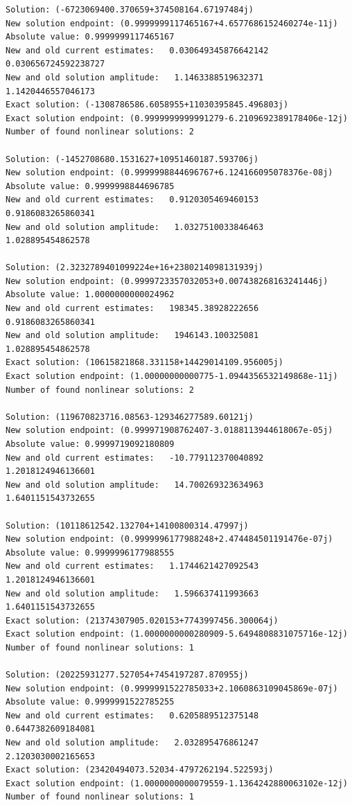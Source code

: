 \documentclass{article}
\begin{document}
\begin{verbatim}
Solution: (-6723069400.370659+374508164.67197484j)
New solution endpoint: (0.9999999117465167+4.6577686152460274e-11j) Absolute value: 0.9999999117465167
New and old current estimates:   0.030649345876642142    0.030656724592238727
New and old solution amplitude:   1.1463388519632371    1.1420446557046173
Exact solution: (-1308786586.6058955+11030395845.496803j)
Exact solution endpoint: (0.9999999999991279-6.2109692389178406e-12j)
Number of found nonlinear solutions: 2

Solution: (-1452708680.1531627+10951460187.593706j)
New solution endpoint: (0.9999998844696767+6.124166095078376e-08j) Absolute value: 0.9999998844696785
New and old current estimates:   0.9120305469460153    0.9186083265860341
New and old solution amplitude:   1.0327510033846463    1.028895454862578

Solution: (2.3232789401099224e+16+2380214098131939j)
New solution endpoint: (0.9999723357032053+0.007438268163241446j) Absolute value: 1.0000000000024962
New and old current estimates:   198345.38928222656    0.9186083265860341
New and old solution amplitude:   1946143.100325081    1.028895454862578
Exact solution: (10615821868.331158+14429014109.956005j)
Exact solution endpoint: (1.00000000000775-1.0944356532149868e-11j)
Number of found nonlinear solutions: 2

Solution: (119670823716.08563-129346277589.60121j)
New solution endpoint: (0.999971908762407-3.0188113944618067e-05j) Absolute value: 0.9999719092180809
New and old current estimates:   -10.779112370040892    1.2018124946136601
New and old solution amplitude:   14.700269323634963    1.6401151543732655

Solution: (10118612542.132704+14100800314.47997j)
New solution endpoint: (0.9999996177988248+2.474484501191476e-07j) Absolute value: 0.9999996177988555
New and old current estimates:   1.1744621427092543    1.2018124946136601
New and old solution amplitude:   1.596637411993663    1.6401151543732655
Exact solution: (21374307905.020153+7743997456.300064j)
Exact solution endpoint: (1.0000000000280909-5.6494808831075716e-12j)
Number of found nonlinear solutions: 1

Solution: (20225931277.527054+7454197287.870955j)
New solution endpoint: (0.9999991522785033+2.1060863109045869e-07j) Absolute value: 0.9999991522785255
New and old current estimates:   0.6205889512375148    0.6447382609184081
New and old solution amplitude:   2.032895476861247    2.1203030002165653
Exact solution: (23420494073.52034-4797262194.522593j)
Exact solution endpoint: (1.0000000000079559-1.1364242880063102e-12j)
Number of found nonlinear solutions: 1


\end{verbatim}
\end{document}
